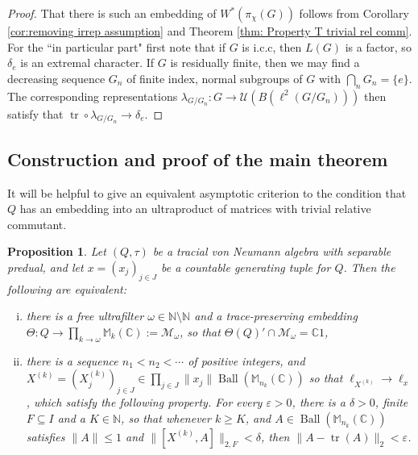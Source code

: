 \documentclass[10pt]{amsart}
\newtheorem{prop}[thm]{Proposition}
\theoremstyle{definition}
\numberwithin{equation}{section}
\newcommand{\bC}{{\mathbb C}}
\newcommand{\bM}{{\mathbb M}}
\newcommand{\bN}{{\mathbb N}}
\newcommand{\cM}{{\mathcal M}}
\newcommand{\cU}{{\mathcal U}}
\DeclareMathOperator{\tr}{tr}
\DeclareMathOperator{\Ball}{Ball}
\begin{document}
\begin{proof}
That there is such an embedding of $W^{*}(\pi_{\chi}(G))$ follows from  Corollary \ref{cor:removing irrep assumption} and Theorem \ref{thm: Property T trivial rel comm}. For the ``in particular part" first note that if $G$ is i.c.c, then $L(G)$ is a factor, so $\delta_{e}$ is an extremal character. If $G$ is residually finite, then we may find a decreasing sequence $G_{n}$ of finite index, normal subgroups of $G$ with $\bigcap_{n}G_{n}=\{e\}$. The corresponding representations $\lambda_{G/G_{n}}\colon G\to \cU(B(\ell^{2}(G/G_{n})))$ then satisfy that $\tr\circ \lambda_{G/G_{n}}\to \delta_{e}$. 
\end{proof}


\subsection{Construction and proof of the main theorem} \label{sec: finally it is done}
It will be helpful to give an equivalent asymptotic criterion to the condition that $Q$ has an embedding into an ultraproduct of matrices with trivial relative commutant. 

\begin{prop}\label{prop: asymptotic rephrase}
Let $(Q,\tau)$ be a tracial von Neumann algebra with separable predual, and let $x=(x_{j})_{j\in J}$ be a countable generating tuple for $Q$. Then the following are equivalent:
\begin{enumerate}[(i)]
    \item there is a free ultrafilter $\omega\in \bN\setminus \bN$ and a trace-preserving embedding $\Theta\colon Q\to\prod_{k\to\omega}\bM_{k}(\bC):=\cM_{\omega}$, so that $\Theta(Q)'\cap \cM_{\omega}=\bC1$, \label{item: trivial relative commutant ultrapower}
    \item there is a sequence $n_{1}<n_{2}<\cdots$ of positive integers, and $X^{(k)}=(X^{(k)}_{j})_{j\in J}\in \prod_{j\in J}\|x_{j}\|\Ball(\bM_{n_{k}}(\bC))$ so that $\ell_{X^{(k)}}\to \ell_{x}$, which satisfy the following property. For every $\varepsilon>0$, there is a $\delta>0$, finite $F\subseteq I$ and a $K\in \bN$, so that whenever $k\geq K$, and $A\in \Ball(\bM_{n_{k}}(\bC))$ satisfies $\|A\|\leq 1$ and $\|[X^{(k)},A]\|_{2,F}<\delta$, then $\|A-\tr(A)\|_{2}<\varepsilon$. \label{item: asymptotic criterion}
\end{enumerate}

\end{prop}
\end{document}
